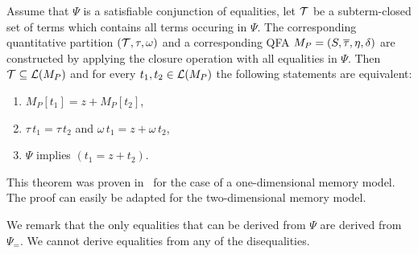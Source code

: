 
\begin{theorem}
  Assume that $\Psi$ is a satisfiable conjunction of equalities, let $\mathcal{T}$ be a subterm-closed set of terms which contains all terms occuring in $\Psi$.
  The corresponding quantitative partition $(\mathcal{T}, \tau,\omega)$ and a corresponding QFA $M_P = (S, \overline{\tau}, \eta, \delta)$ are constructed by applying the closure operation with all equalities in $\Psi$.
  Then $\mathcal{T} \subseteq \mathcal{L}(M_P)$ and for every $t_1, t_2 \in \mathcal{L}(M_P)$ the following statements are equivalent:
  \begin{enumerate}
    \item $M_P[t_1] = z + M_P[t_2]$,
    \item $\tau\,t_1 = \tau\,t_2$ and $\omega\,t_1 = z + \omega\,t_2$,
    \item $\Psi$ implies $(t_1 = z + t_2)$.
  \end{enumerate}
\end{theorem}

This theorem was proven in~\cite{2pointer} for the case of a one-dimensional memory model.
The proof can easily be adapted for the two-dimensional memory model.

We remark that the only equalities that can be derived from $\Psi$ are derived from $\Psi_=$. We cannot derive equalities from any of the disequalities.
